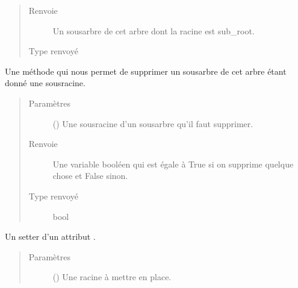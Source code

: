 \documentclass[letterpaper,10pt,french]{sphinxmanual}
\begin{document}
\begin{fulllineitems}
\begin{fulllineitems}
\begin{quote}
\begin{description}
\item[{Renvoie}] \leavevmode
{} \textendash{} Un sous\sphinxhyphen{}arbre de cet arbre dont la racine est sub\_root.

\item[{Type renvoyé}] \leavevmode
{\hyperref[\detokenize{index:StrategyTree.StrategyTree}]{}}

\end{description}\end{quote}

\end{fulllineitems}


\begin{fulllineitems}
\label{\detokenize{index:StrategyTree.StrategyTree.remove_sub_tree}}
Une méthode qui nous permet de supprimer un sous\sphinxhyphen{}arbre de cet arbre étant donné une sous\sphinxhyphen{}racine.
\begin{quote}\begin{description}
\item[{Paramètres}] \leavevmode
{} () \textendash{} Une sous\sphinxhyphen{}racine d’un sous\sphinxhyphen{}arbre qu’il faut supprimer.

\item[{Renvoie}] \leavevmode
{} \textendash{} Une variable booléen qui est égale à True si on supprime quelque chose et False sinon.

\item[{Type renvoyé}] \leavevmode
bool

\end{description}\end{quote}

\end{fulllineitems}


\begin{fulllineitems}
\label{\detokenize{index:StrategyTree.StrategyTree.set_root}}
Un setter d’un attribut .
\begin{quote}\begin{description}
\item[{Paramètres}] \leavevmode
{} ({\hyperref[\detokenize{index:StrategyTree.NodeST}]{}}) \textendash{} Une racine à mettre en place.


\end{description}
\end{quote}
\end{fulllineitems}
\end{fulllineitems}
\end{document}

